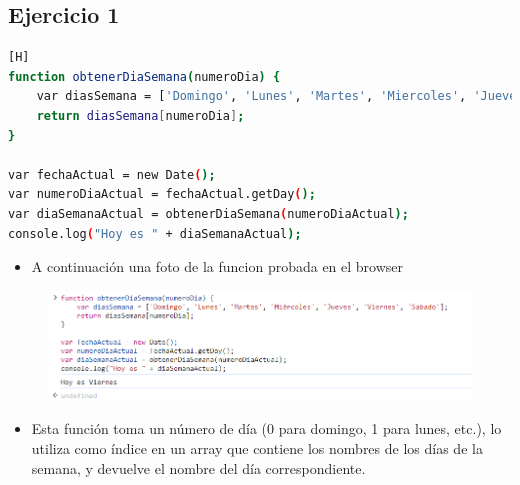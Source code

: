 \documentclass{article}
\begin{document}
 	\subsection{Ejercicio 1}
		\begin{lstlisting}[language=bash,caption={Código del JavaScript}][H]
function obtenerDiaSemana(numeroDia) {
    var diasSemana = ['Domingo', 'Lunes', 'Martes', 'Miercoles', 'Jueves', 'Viernes', 'Sabado'];
    return diasSemana[numeroDia];
}

var fechaActual = new Date();
var numeroDiaActual = fechaActual.getDay();
var diaSemanaActual = obtenerDiaSemana(numeroDiaActual);
console.log("Hoy es " + diaSemanaActual);
		\end{lstlisting}
	\begin{itemize}
			\item A continuación una foto de la funcion probada en el browser
		\end{itemize} 
		\begin{figure}[H]
			\centering
			\includegraphics[width=1.0\textwidth,keepaspectratio]{img/ejercicio1.PNG}
		\end{figure}
		\begin{itemize}
			\item Esta función toma un número de día (0 para domingo, 1 para lunes, etc.), lo utiliza como índice en un array que contiene los nombres de los días de la semana, y devuelve el nombre del día correspondiente.
		\end{itemize} 
\end{document}
